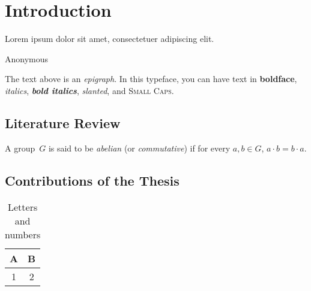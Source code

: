 
\chapter{Introduction}

\epigraph{Lorem ipsum dolor sit amet,
consectetuer adipiscing elit.}{Anonymous}

The text above is an \emph{epigraph}. In this typeface, you can have
text in \textbf{boldface}, \emph{italics}, \textbf{\emph{bold
    italics}}, \textsl{slanted}, and \textsc{Small Caps}.

\section{Literature Review}
\cite{Knuth1986}

\blindtext\pagenote{\blindtext}

\blindtext[2]

\begin{defn}
A group~$G$ is said to be \emph{abelian} (or \emph{commutative}) if
for every $a, b \in G$, $a \cdot b = b \cdot a$.
\end{defn}

\blindtext[2]

\section{Contributions of the Thesis}

\blindtext[3]

\begin{table}
  \begin{center}
  \begin{tabular}{c|c}
    A & B \\
    \hline
    1 & 2
  \end{tabular}
  \end{center}
  \caption{Letters and numbers}
\end{table}

\blindtext[3]
